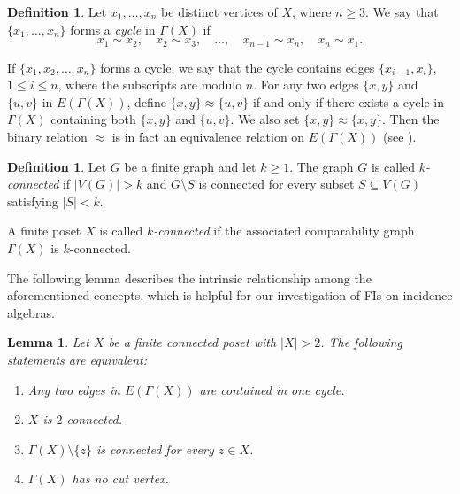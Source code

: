 \documentclass[reqno]{amsart}
\numberwithin{equation}{section}
\theoremstyle{plain}
\newtheorem{lemma}[theorem]{Lemma}
\theoremstyle{definition}
\newtheorem{definition}[theorem]{Definition}
\begin{document}
\begin{definition}\label{def:cycle}
Let $x_1,\ldots,x_n$ be distinct vertices of $X$, where $n\geq3$.
We say that $\{x_1,\ldots,x_n\}$ forms a \emph{cycle} in
$\Gamma(X)$ if
\[
x_1\sim x_2,\quad x_2\sim x_3,\quad\ldots,\quad
x_{n-1}\sim x_n,\quad x_n\sim x_1.
\]
\end{definition}

If $\{x_1,x_2,\ldots,x_n\}$ forms a cycle, we say that the cycle contains edges
$\{x_{i-1},x_i\}$, $1\leq i\leq n$, where the subscripts are modulo $n$.
For any two edges $\{x,y\}$ and $\{u,v\}$ in $E(\Gamma(X))$, define
$
\{x,y\}\approx\{u,v\}
$
if and only if there exists a cycle in $\Gamma(X)$ containing both
$\{x,y\}$ and $\{u,v\}$. We also set $\{x,y\}\approx\{x,y\}$. Then
the binary relation $\approx$ is in fact an equivalence relation on
$E(\Gamma(X))$ (see \cite[Lemma 2.2]{Yang19}).

\begin{definition}\label{def:k-connected}
Let $G$ be a finite graph and let $k\geq1$. The graph $G$ is called
\emph{$k$-connected} if $|V(G)|>k$ and $G\setminus S$ is connected
for every subset $S\subseteq V(G)$ satisfying $|S|<k$.

A finite poset $X$ is called \emph{$k$-connected} if the associated
comparability graph $\Gamma(X)$ is $k$-connected.
\end{definition}

The following lemma describes the intrinsic relationship among the aforementioned concepts,
which is helpful for our investigation of FIs on incidence algebras.

\begin{lemma}\label{lem:graph-equivalences}
Let $X$ be a finite connected poset with $|X|>2$. The following statements are
equivalent:
\begin{enumerate}
\item[(a)] Any two edges in $E(\Gamma(X))$ are contained in one cycle.
\item[(b)] $X$ is $2$-connected.
\item[(c)] $\Gamma(X)\setminus\{z\}$ is connected for every $z\in X$.
\item[(d)] $\Gamma(X)$ has no cut vertex.
\end{enumerate}
\end{lemma}
\end{document}
